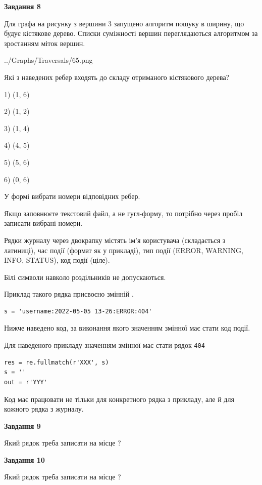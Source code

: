 \documentclass[12pt, ukrainian]{article}
\def\code#1{\Verb!#1!}
\begin{document}
{\begin {large}
{\begin {center}\textbf{Завдання 8}\end {center}}\par
Для графа на рисунку з вершини 3 запущено алгоритм пошуку в ширину, що будує кістякове дерево. Списки суміжності вершин переглядаються алгоритмом за зростанням міток вершин.\par
\begin{center}
	{../Graphs/Traversals/65.png}
\end{center}
\par Які з наведених ребер входять до складу отриманого кістякового дерева?\par
1) (1, 6)\par
2) (1, 2)\par
3) (1, 4)\par
4) (4, 5)\par
5) (5, 6)\par
6) (0, 6)\par
{\vskip 15pt} У формі вибрати номери відповідних ребер.


Якщо заповнюєте текстовий файл, а не гугл-форму, то потрібно через пробіл записа\-ти вибрані номери.\par
\newpage


Рядки журналу через двокрапку містять ім'я користувача (складається з латиниці), час події (фор\-мат як у прикладі), тип події (ERROR, WARNING, INFO, STATUS), код події (ціле).

Білі символи навколо роздільників не допускаються.

Приклад такого рядка присвоєно змінній .



\begin{verbatim}
s = 'username:2022-05-05 13-26:ERROR:404'
\end{verbatim}


Нижче наведено код, за виконання якого значенням змінної  має стати код події.

Для наведеного прикладу значенням змінної  має стати рядок \code{404}



\begin{verbatim}
res = re.fullmatch(r'XXX', s)
s = ''
out = r'YYY'
\end{verbatim}


Код має працювати не тільки для конкретного рядка з прикладу, але й для кожного рядка з журналу.

{\begin {center}\textbf{Завдання 9}\end {center}}\par
Який рядок треба записати на місце  ?\par
\vspace{5mm}


{\begin {center}\textbf{Завдання 10}\end {center}}\par
Який рядок треба записати на місце  ?\par


\newpage


\end {large}}
\end{document}
